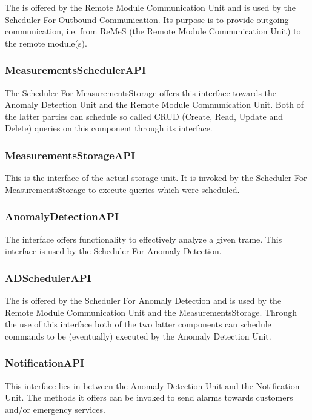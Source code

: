 \npar The  is offered by the Remote Module
Communication Unit and is used by the Scheduler For Outbound Communication. Its
purpose is to provide outgoing communication, i.e. from ReMeS (the Remote Module
Communication Unit) to the remote module(s).

\subsubsection{MeasurementsSchedulerAPI}

\npar The Scheduler For MeasurementsStorage offers this interface towards the
Anomaly Detection Unit and the Remote Module Communication Unit. Both of the
latter parties can schedule so called CRUD (Create, Read, Update and Delete)
queries on this component through its interface.

\subsubsection{MeasurementsStorageAPI}

\npar This is the interface of the actual storage unit. It is invoked by the
Scheduler For MeasurementsStorage to execute queries which were scheduled.  

\subsubsection{AnomalyDetectionAPI}

\npar The  interface offers functionality to
effectively analyze a given trame. This interface is used by the Scheduler For
Anomaly Detection.

\subsubsection{ADSchedulerAPI}

\npar The  is offered by the Scheduler For
Anomaly Detection and is used by the Remote Module Communication Unit and the
MeasurementsStorage. Through the use of this interface both of the two latter
components can schedule commands to be (eventually) executed by the Anomaly
Detection Unit.

\subsubsection{NotificationAPI}

\npar This interface lies in between the Anomaly Detection Unit and the
Notification Unit. The methods it offers can be invoked to send alarms towards
customers and/or emergency services.


